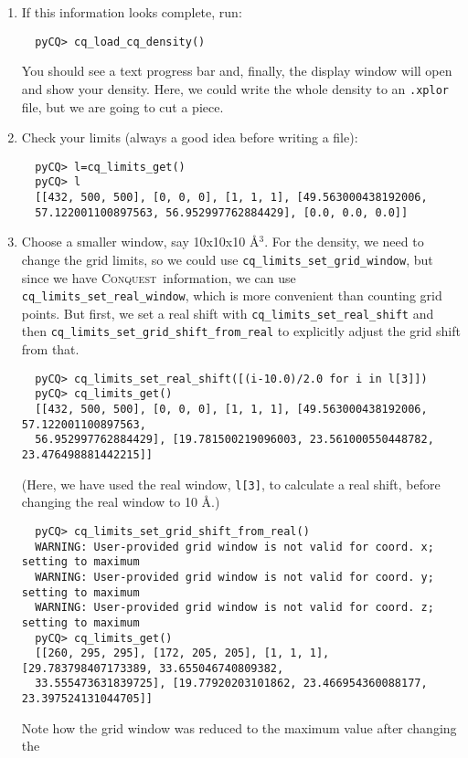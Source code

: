 \documentclass[a4paper,notitlepage,11pt]{article}
\def\CQ{\textsc{Conquest}}
\begin{document}
\begin{enumerate}
{  }
  \item If this information looks complete, run:
{\scriptsize
  \begin{verbatim}
  pyCQ> cq_load_cq_density()
  \end{verbatim}
  }
  You should see a text progress bar and, finally, the display window will open
  and show your density. Here, we could write the whole density to an \texttt{.xplor} file, but we are going to cut a piece.
  \item Check your limits (always a good idea before writing a file):
{\scriptsize
  \begin{verbatim}
  pyCQ> l=cq_limits_get()
  pyCQ> l
  [[432, 500, 500], [0, 0, 0], [1, 1, 1], [49.563000438192006,
  57.122001100897563, 56.952997762884429], [0.0, 0.0, 0.0]]
  \end{verbatim}
  }
  \item Choose a smaller window, say 10x10x10 \AA$^3$.
  For the density, we need to change the grid limits, so we could use 
  \texttt{cq\_limits\_set\_grid\_window}, but since we have \CQ\ information, 
  we can use \texttt{cq\_limits\_set\_real\_window}, which is more convenient
  than counting grid points. But first, we set a real shift with
  \texttt{cq\_limits\_set\_real\_shift} and then
  \texttt{cq\_limits\_set\_grid\_shift\_from\_real} to explicitly adjust the grid shift from that.
{\scriptsize
  \begin{verbatim}
  pyCQ> cq_limits_set_real_shift([(i-10.0)/2.0 for i in l[3]])
  pyCQ> cq_limits_get()
  [[432, 500, 500], [0, 0, 0], [1, 1, 1], [49.563000438192006, 57.122001100897563, 
  56.952997762884429], [19.781500219096003, 23.561000550448782, 23.476498881442215]] 
  \end{verbatim}
  }
  (Here, we have used the real window, \texttt{l[3]}, to calculate a real shift, before changing the real window to 10 \AA.)
{\scriptsize
  \begin{verbatim}
  pyCQ> cq_limits_set_grid_shift_from_real() 
  WARNING: User-provided grid window is not valid for coord. x; setting to maximum
  WARNING: User-provided grid window is not valid for coord. y; setting to maximum
  WARNING: User-provided grid window is not valid for coord. z; setting to maximum
  pyCQ> cq_limits_get()
  [[260, 295, 295], [172, 205, 205], [1, 1, 1], [29.783798407173389, 33.655046740809382, 
  33.555473631839725], [19.77920203101862, 23.466954360088177, 23.397524131044705]]
  \end{verbatim}
  }
  Note how the grid window was reduced to the maximum value after changing the

\end{enumerate}
\end{document}
